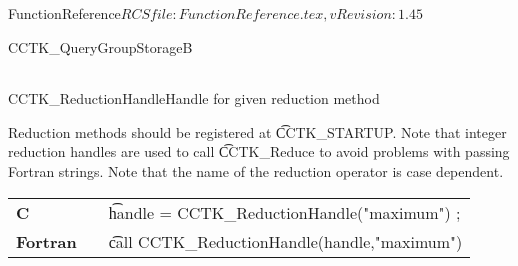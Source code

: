 \begin{cactuspart}{5}{FunctionReference}{$RCSfile: FunctionReference.tex,v $}{$Revision: 1.45 $}
\begin{CCTKFunc}{CCTK\_QueryGroupStorageB}{}
\label{CCTK-QueryGroupStorageB}
\showcargs
\begin{params}
\end{params}
\begin{discussion}
\end{discussion}
\begin{examples}
\begin{tabular}{@{}p{3cm}cp{11cm}}
\end{tabular}
\end{examples}
\begin{errorcodes}
\end{errorcodes}
\end{CCTKFunc}




\begin{CCTKFunc}{CCTK\_ReductionHandle}{Handle for given reduction method}
\label{CCTK-ReductionHandle}
\showargs
\begin{params}
\end{params}
\begin{discussion}
Reduction methods should be registered at {\t CCTK\_STARTUP}. Note that
integer reduction handles are used to call {\t CCTK\_Reduce} to avoid
problems with passing Fortran strings. Note that the name of the reduction
operator is case dependent.
\end{discussion}
\begin{examples}
\begin{tabular}{@{}p{3cm}cp{11cm}}
\hfill {\bf C} && {\t handle = CCTK\_ReductionHandle("maximum") };
\\
\hfill {\bf Fortran} && {\t call CCTK\_ReductionHandle(handle,"maximum")}
\\
\end{tabular}
\end{examples}
\begin{errorcodes}
\end{errorcodes}
\end{CCTKFunc}




\end{cactuspart}
